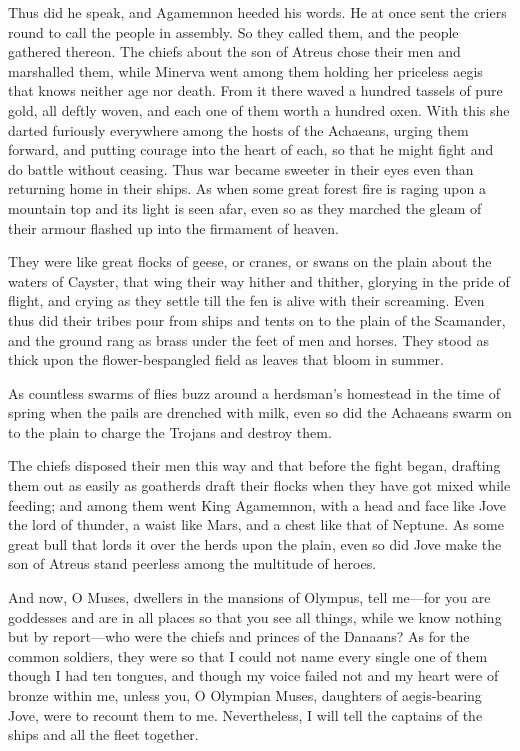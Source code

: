 Thus did he speak, and Agamemnon heeded his words. He at once sent the
criers round to call the people in assembly. So they called them, and the
people gathered thereon. The chiefs about the son of Atreus chose their
men and marshalled them, while Minerva went among them holding her
priceless aegis that knows neither age nor death. From it there waved a
hundred tassels of pure gold, all deftly woven, and each one of them worth
a hundred oxen. With this she darted furiously everywhere among the hosts
of the Achaeans, urging them forward, and putting courage into the heart
of each, so that he might fight and do battle without ceasing. Thus war
became sweeter in their eyes even than returning home in their ships. As
when some great forest fire is raging upon a mountain top and its light is
seen afar, even so as they marched the gleam of their armour flashed up
into the firmament of heaven.

They were like great flocks of geese, or cranes, or swans on the plain
about the waters of Cayster, that wing their way hither and thither,
glorying in the pride of flight, and crying as they settle till the fen is
alive with their screaming. Even thus did their tribes pour from ships and
tents on to the plain of the Scamander, and the ground rang as brass under
the feet of men and horses. They stood as thick upon the flower-bespangled
field as leaves that bloom in summer.

As countless swarms of flies buzz around a herdsman’s homestead in the
time of spring when the pails are drenched with milk, even so did the
Achaeans swarm on to the plain to charge the Trojans and destroy them.

The chiefs disposed their men this way and that before the fight began,
drafting them out as easily as goatherds draft their flocks when they have
got mixed while feeding; and among them went King Agamemnon, with a head
and face like Jove the lord of thunder, a waist like Mars, and a chest
like that of Neptune. As some great bull that lords it over the herds upon
the plain, even so did Jove make the son of Atreus stand peerless among
the multitude of heroes.

And now, O Muses, dwellers in the mansions of Olympus, tell me—for
you are goddesses and are in all places so that you see all things, while
we know nothing but by report—who were the chiefs and princes of the
Danaans? As for the common soldiers, they were so that I could not name
every single one of them though I had ten tongues, and though my voice
failed not and my heart were of bronze within me, unless you, O Olympian
Muses, daughters of aegis-bearing Jove, were to recount them to me.
Nevertheless, I will tell the captains of the ships and all the fleet
together.

